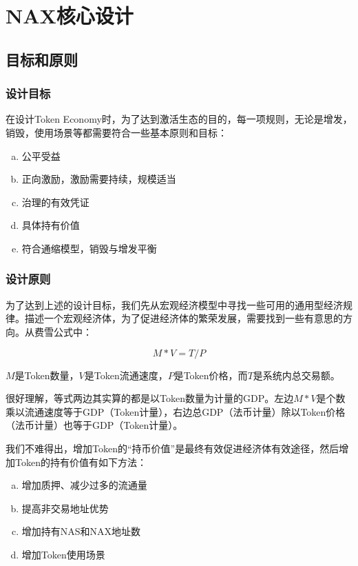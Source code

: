 \section{NAX核心设计}
\subsection{目标和原则}
\subsubsection{设计目标}
在设计Token Economy时，为了达到激活生态的目的，每一项规则，无论是增发，销毁，使用场景等都需要符合一些基本原则和目标：

\begin{enumerate}[a.]
	\item 公平受益
	\item 正向激励，激励需要持续，规模适当
        \item 治理的有效凭证
        \item 具体持有价值
        \item 符合通缩模型，销毁与增发平衡
\end{enumerate}

\subsubsection{设计原则}
为了达到上述的设计目标，我们先从宏观经济模型中寻找一些可用的通用型经济规律。描述一个宏观经济体，为了促进经济体的繁荣发展，需要找到一些有意思的方向。从费雪公式中：

\begin{equation}
M * V = T / P
\end{equation}

\(M\)是Token数量，\(V\)是Token流通速度，\(P\)是Token价格，而\(T\)是系统内总交易额。

很好理解，等式两边其实算的都是以Token数量为计量的GDP。左边\(M * V\)是个数乘以流通速度等于GDP（Token计量），右边总GDP（法币计量）除以Token价格（法币计量）也等于GDP（Token计量）。

我们不难得出，增加Token的“持币价值”是最终有效促进经济体有效途径，然后增加Token的持有价值有如下方法：

\begin{enumerate}[a.]
	\item 增加质押、减少过多的流通量
	\item 提高非交易地址优势
	\item 增加持有NAS和NAX地址数
	\item 增加Token使用场景
\end{enumerate}

